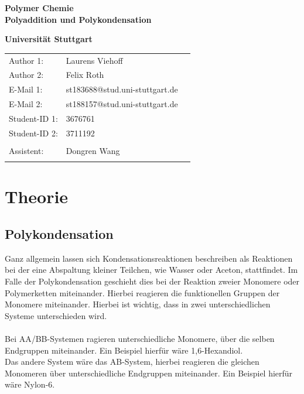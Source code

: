 \documentclass[10pt,a4paper,ngerman]{scrartcl}
\begin{document}
\begin{titlepage}
	\vspace*{2,5cm}
	\begin{center}
		\begin{LARGE}
			\textbf{Polymer Chemie}\\
			\textbf{Polyaddition und Polykondensation}\\
		\end{LARGE}
		\vspace{1cm}
		\textbf{Universität Stuttgart}\\
		\vspace*{1,5cm}
		\begin{tabular}{lp{}l}
			Author 1:     &Laurens Viehoff\\
            Author 2:     &Felix Roth\\   
			E-Mail 1:      &st183688@stud.uni-stuttgart.de\\
            E-Mail 2:      &st188157@stud.uni-stuttgart.de  \\
			Student-ID 1: & 3676761   \\ 
            Student-ID 2: & 3711192 \\ \\
			Assistent:  &  Dongren Wang \\ \\ 
		\end{tabular}
	\end{center}

    
\end{titlepage}
\thispagestyle{empty}
\renewcommand{\thepage}{\arabic{page}}
\newpage
\tableofcontents
\setcounter{page}{1}
\renewcommand{\thepage}{\arabic{page}}
\newpage

\section{Theorie}

	\subsection{Polykondensation}

		Ganz allgemein lassen sich Kondensationsreaktionen beschreiben als Reaktionen bei der eine Abspaltung kleiner Teilchen, wie Wasser oder Aceton, stattfindet.
		Im Falle der Polykondensation geschieht dies bei der Reaktion zweier Monomere oder Polymerketten miteinander. 
		Hierbei reagieren die funktionellen Gruppen der Monomere miteinander. Hierbei ist wichtig, dass in zwei unterschiedlichen Systeme unterschieden wird.\\\\
		Bei AA/BB-Systemen ragieren unterschiedliche Monomere, über die selben Endgruppen miteinander. Ein Beispiel hierfür wäre 1,6-Hexandiol.\\
		Das andere System wäre das AB-System, hierbei reagieren die gleichen Monomeren über unterschiedliche Endgruppen miteinander. Ein Beispiel hierfür wäre Nylon-6.\\
\end{document}
